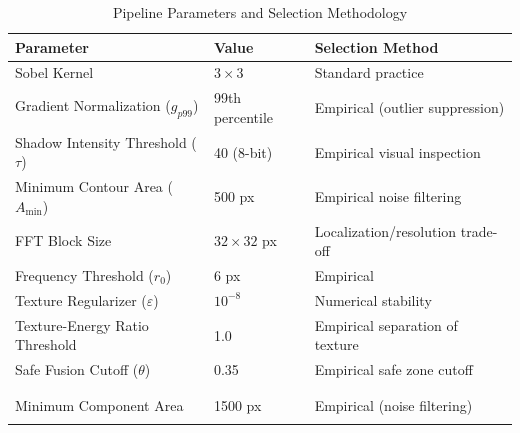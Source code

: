 \documentclass{article}
\begin{document}
\begin{table}[htbp]
\centering
\caption{Pipeline Parameters and Selection Methodology}
\begin{tabular}{@{}lll@{}}
\toprule
\textbf{Parameter} & \textbf{Value} & \textbf{Selection Method} \\ \midrule
Sobel Kernel & $3 \times 3$ & Standard practice \cite{sobel1968} \\
Gradient Normalization ($g_{p99}$) & 99th percentile & Empirical (outlier suppression) \\
Shadow Intensity Threshold ($\tau$) & 40 (8-bit) & Empirical visual inspection \\
Minimum Contour Area ($A_{\min}$) & 500 px & Empirical noise filtering \\
FFT Block Size & $32 \times 32$ px & Localization/resolution trade-off \\
Frequency Threshold ($r_0$) & 6 px & Empirical \\
Texture Regularizer ($\varepsilon$) & $10^{-8}$ & Numerical stability \\
Texture-Energy Ratio Threshold & 1.0 & Empirical separation of texture \\
Safe Fusion Cutoff ($\theta$) & 0.35 & Empirical safe zone cutoff \\\\\\
Minimum Component Area & 1500 px & Empirical (noise filtering) \\\\
\bottomrule
\end{tabular}
\label{tab:parameters}
\end{table}
\end{document}
